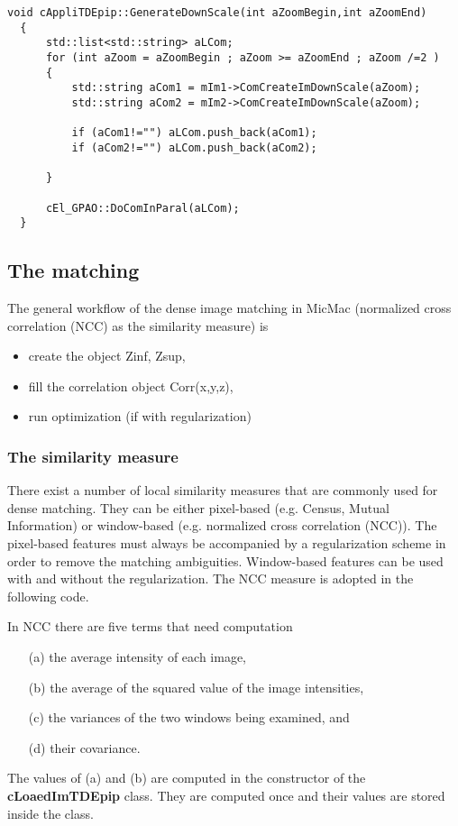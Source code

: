 \begin{lstlisting}
void cAppliTDEpip::GenerateDownScale(int aZoomBegin,int aZoomEnd)
  {
	  std::list<std::string> aLCom;
	  for (int aZoom = aZoomBegin ; aZoom >= aZoomEnd ; aZoom /=2 )
	  {
		  std::string aCom1 = mIm1->ComCreateImDownScale(aZoom);
		  std::string aCom2 = mIm2->ComCreateImDownScale(aZoom);

		  if (aCom1!="") aLCom.push_back(aCom1);
		  if (aCom2!="") aLCom.push_back(aCom2);

	  }

	  cEl_GPAO::DoComInParal(aLCom);
  }
\end{lstlisting}



\subsection{The matching}\label{subsection:match}
The general workflow of the dense image matching in MicMac (normalized cross correlation (NCC) as the similarity measure) is
\begin{itemize}
  \item create the object Zinf, Zsup,
  \item fill the correlation object Corr(x,y,z),
  \item run optimization (if with regularization)
\end{itemize}

\subsubsection{The similarity measure}
There exist a number of local similarity measures that are commonly used for dense matching. They can be either pixel-based (e.g. Census, Mutual Information) or window-based (e.g. normalized cross correlation (NCC)). The pixel-based features must always be accompanied by a regularization scheme in order to remove the matching ambiguities. Window-based features can be used with and without the regularization. The NCC measure is adopted in the following code.\newline

\noindent In NCC there are five terms that need computation
\begin{itemize}
  \item[(a)] the average intensity of each image,
  \item[(b)] the average of the squared value of the image intensities,
  \item[(c)] the variances of the two windows being examined, and
  \item[(d)] their covariance.\newline
\end{itemize}
\noindent The values of (a) and (b) are computed in the constructor of the \textbf{cLoaedImTDEpip} class. They are computed once and their values are stored inside the class.


